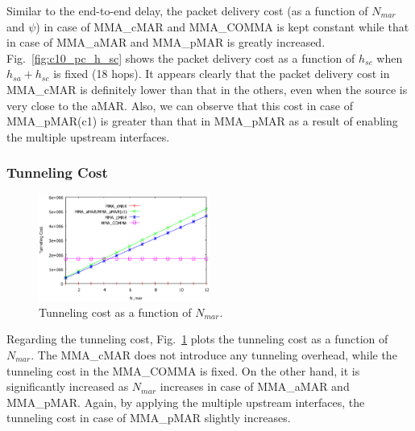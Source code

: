 Similar to the end-to-end delay, the packet delivery cost (as a function of $N_{mar}$ and  $\psi$) in case of MMA\_cMAR and MMA\_COMMA is kept constant while that in case of MMA\_aMAR and MMA\_pMAR is greatly increased. Fig.~\ref{fig:c10_pc_h_sc} shows the packet delivery cost as a function of $h_{sc}$ when $h_{sa} + h_{sc}$ is fixed (18 hops). It appears clearly that the packet delivery cost in MMA\_cMAR is definitely lower than that in the others, even when the source is very close to the aMAR. Also, we can observe that this cost in case of MMA\_pMAR(c1) is greater than that in MMA\_pMAR as a result of enabling the multiple upstream interfaces. 

\subsubsection{Tunneling Cost}
\begin{figure}[h!]
 	\begin{center} 
		\includegraphics[width=0.50\textwidth]{./Part3/Chapter8/figures/c10_tc_n_mar.eps}
		\caption[Tunneling cost.]{Tunneling cost as a function of $N_{mar}$.}
		\label{fig:c10_tc_n_mar}
	\end{center}
\end{figure}

Regarding the tunneling cost, Fig.~\ref{fig:c10_tc_n_mar} plots the tunneling cost as a function of $N_{mar}$. The MMA\_cMAR does not introduce any tunneling overhead, while the tunneling cost in the MMA\_COMMA is fixed. On the other hand, it is significantly increased as $N_{mar}$ increases in case of MMA\_aMAR and MMA\_pMAR. Again, by applying the multiple upstream interfaces, the tunneling cost in case of MMA\_pMAR slightly increases.

